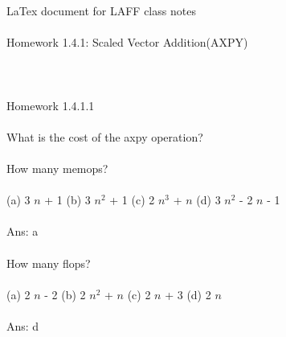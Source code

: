 \documentclass[11pt]{article}
\begin{document}
LaTex document for LAFF class notes
\\
\\
Homework 1.4.1: Scaled Vector Addition(AXPY)
\\
\\
\\
\\
Homework 1.4.1.1
\\
\\
What is the cost of the axpy operation?
\\
\\
How many memops?
\\
\\
(a)
3
$n$
+
1
(b)
3
$n^2$
+
1
(c)
2
$n^3$
+
$n$
(d)
3
$n^2$
-
2
$n$
-
1
\\
\\
Ans: a
\\
\\
How many flops?
\\
\\
(a)
2
$n$
-
2
(b)
2
$n^2$
+
$n$
(c)
2
$n$
+
3
(d)
2
$n$
\\
\\
Ans: d
\end{document}
